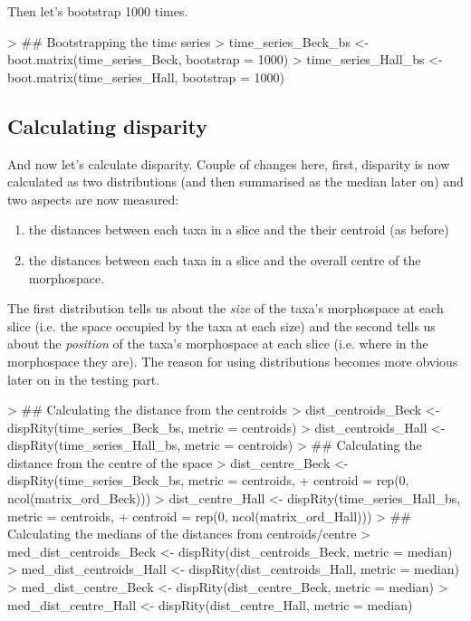 \documentclass{article}
\begin{document}
Then let's bootstrap 1000 times.

\begin{Schunk}
\begin{Sinput}
> ## Bootstrapping the time series
> time_series_Beck_bs <- boot.matrix(time_series_Beck, bootstrap = 1000)
> time_series_Hall_bs <- boot.matrix(time_series_Hall, bootstrap = 1000)
\end{Sinput}
\end{Schunk}

\subsection{Calculating disparity}

And now let's calculate disparity.
Couple of changes here, first, disparity is now calculated as two distributions (and then summarised as the median later on) and two aspects are now measured:
\begin{enumerate}
\item the distances between each taxa in a slice and the their centroid (as before)
\item the distances between each taxa in a slice and the overall centre of the morphospace.
\end{enumerate}
The first distribution tells us about the \textit{size} of the taxa's morphospace at each slice (i.e. the space occupied by the taxa at each size) and the second tells us about the \textit{position} of the taxa's morphospace at each slice (i.e. where in the morphospace they are).
The reason for using distributions becomes more obvious later on in the testing part.

\begin{Schunk}
\begin{Sinput}
> ## Calculating the distance from the centroids
> dist_centroids_Beck <- dispRity(time_series_Beck_bs, metric = centroids)
> dist_centroids_Hall <- dispRity(time_series_Hall_bs, metric = centroids)
> ## Calculating the distance from the centre of the space
> dist_centre_Beck <- dispRity(time_series_Beck_bs, metric = centroids,
+                                centroid = rep(0, ncol(matrix_ord_Beck)))
> dist_centre_Hall <- dispRity(time_series_Hall_bs, metric = centroids,
+                                centroid = rep(0, ncol(matrix_ord_Hall)))
> ## Calculating the medians of the distances from centroids/centre
> med_dist_centroids_Beck <- dispRity(dist_centroids_Beck, metric = median)
> med_dist_centroids_Hall <- dispRity(dist_centroids_Hall, metric = median)
> med_dist_centre_Beck <- dispRity(dist_centre_Beck, metric = median)
> med_dist_centre_Hall <- dispRity(dist_centre_Hall, metric = median)
\end{Sinput}
\end{Schunk}
\end{document}
